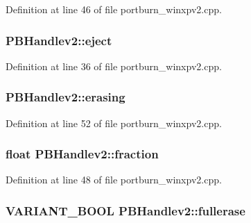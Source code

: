 Definition at line 46 of file portburn\+\_\+winxpv2.\+cpp.

\subsubsection[{\texorpdfstring{eject}{eject}}]{ P\+B\+Handlev2\+::eject}\hypertarget{struct_p_b_handlev2_a6613518255c7e19899fab520a140d4f9}{}\label{struct_p_b_handlev2_a6613518255c7e19899fab520a140d4f9}


Definition at line 36 of file portburn\+\_\+winxpv2.\+cpp.

\subsubsection[{\texorpdfstring{erasing}{erasing}}]{ P\+B\+Handlev2\+::erasing}\hypertarget{struct_p_b_handlev2_a46798afd2891f6837f5484556426f385}{}\label{struct_p_b_handlev2_a46798afd2891f6837f5484556426f385}


Definition at line 52 of file portburn\+\_\+winxpv2.\+cpp.

\subsubsection[{\texorpdfstring{fraction}{fraction}}]{\setlength{\rightskip}{0pt plus 5cm}float P\+B\+Handlev2\+::fraction}\hypertarget{struct_p_b_handlev2_a93a1204aa5b9aec97cac7341d538363f}{}\label{struct_p_b_handlev2_a93a1204aa5b9aec97cac7341d538363f}


Definition at line 48 of file portburn\+\_\+winxpv2.\+cpp.

\subsubsection[{\texorpdfstring{fullerase}{fullerase}}]{\setlength{\rightskip}{0pt plus 5cm}V\+A\+R\+I\+A\+N\+T\+\_\+\+B\+O\+OL P\+B\+Handlev2\+::fullerase}\hypertarget{struct_p_b_handlev2_ab241ac3e8f634a39ec13f016261d8b61}{}\label{struct_p_b_handlev2_ab241ac3e8f634a39ec13f016261d8b61}


